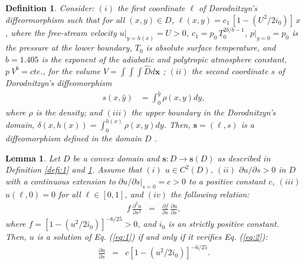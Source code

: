 \documentclass{article}
\newtheorem{definition}{Definition}
\newtheorem{lemma}{Lemma}
\begin{document}
\begin{definition}\label{defi:2}
Consider:
$(i)$ the first coordinate $\ell$ of Dorodnitzyn's diffeormorphism 
such that for all $\left(x,y\right) \in D$, 
$\ell \left(x,y\right) = 
   c_1 \hspace{2pt}  \left[1-\left(U^2/2i_0\right)\right] \hspace{2pt} x$,
where the \emph{free-stream} velocity $u|_{y=h(x)}=U>0$,
$c_1= p_0 \hspace{2pt} T_0^{2b/b-1}$, $p|_{y=0}=p_0$ is the pressure
at the lower boundary, $T_0$ is absolute surface temperature, and
$b= 1.405$ is the exponent of the \emph{adiabatic} and \emph{polytropic} atmosphere constant,
$p\ V^{b}=cte.$, for the volume $V=\int\!\!\int\!\!\int \hat{D}d\mathbf{x}$ \cite[p. 35]{Tiet};
 $(ii)$ the second coordinate $s$ of Dorodnitzyn's diffeomorphism
 \begin{equation*}
\begin{split}
  s \left(x,\hat{y}\right) & = \int_0^{\hat{y}}\rho(x,y)dy,
\end{split} 
\end{equation*}
where $\rho$ is the density; and $(iii)$ the upper boundary 
in the Dorodnitzyn's domain,
 $\delta(x,h(x))=\int_0^{h(x)}\rho(x,y)dy$.
 Then, $\mathbf{s}=(\ell,s)$ is a diffeomorphism defined in the domain $D$ \cite{val18}.
\end{definition}

\begin{lemma}\label{lem:1}
Let $D$ be a convex domain and $\mathbf{s}:D\to \mathbf{s}(D)$ as described in Definition \ref{defi:1}
and \ref{defi:2}.
Assume that $(i)$ $u\in C^2(D)$, $(ii)$
$\partial u/ \partial s>0$ in $D$ with a continuous extension to
 $\partial u/\partial s|_{s=0}=c>0$
to a positive constant $c$,
$(iii)$  $u(\ell,0)=0$ for all $\ell \in [0,1]$,
and $(iv)$ the following relation:
\begin{eqnarray}\label{eq:1}
   f
    \hspace{2pt}
    \frac{\partial^2 u}{\partial s^2}
&=&
\frac{\partial f}{\partial s}
\hspace{2pt}
\frac{\partial u}{\partial s},
\end{eqnarray}
where $f=\left[1-\left(u^2/2i_0\right)\right]^{-6/25}>0$, 
and $i_0$ is an strictly positive constant.
Then, $u$ is a solution of Eq. (\ref{eq:1}) if and only if 
it verifies Eq. (\ref{eq:2}):
\begin{eqnarray}\label{eq:2}
    \frac{\partial u}{\partial s}
&=& c
\left[1-\left(u^2/2i_0\right)\right]^{-6/25}.
\end{eqnarray}
\end{lemma}
\end{document}

